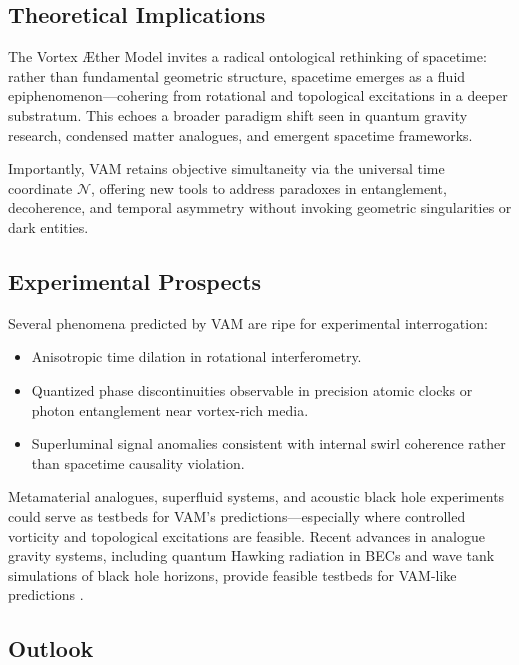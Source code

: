 \documentclass[12pt]{article}
\begin{document}
    \subsection*{Theoretical Implications}

    The Vortex Æther Model invites a radical ontological rethinking of spacetime: rather than fundamental geometric structure, spacetime emerges as a fluid epiphenomenon—cohering from rotational and topological excitations in a deeper substratum. This echoes a broader paradigm shift seen in quantum gravity research, condensed matter analogues, and emergent spacetime frameworks.

    Importantly, VAM retains objective simultaneity via the universal time coordinate \( \mathcal{N} \), offering new tools to address paradoxes in entanglement, decoherence, and temporal asymmetry without invoking geometric singularities or dark entities.

    \subsection*{Experimental Prospects}

    Several phenomena predicted by VAM are ripe for experimental interrogation:

    \begin{itemize}
        \item Anisotropic time dilation in rotational interferometry.
        \item Quantized phase discontinuities observable in precision atomic clocks or photon entanglement near vortex-rich media.
        \item Superluminal signal anomalies consistent with internal swirl coherence rather than spacetime causality violation.
    \end{itemize}

    Metamaterial analogues, superfluid systems, and acoustic black hole experiments could serve as testbeds for VAM's predictions—especially where controlled vorticity and topological excitations are feasible. Recent advances in analogue gravity systems, including quantum Hawking radiation in BECs and wave tank simulations of black hole horizons, provide feasible testbeds for VAM-like predictions \cite{steinhauer2016hawking, weinfurtner2011hawking}.

    \subsection*{Outlook}
\end{document}
